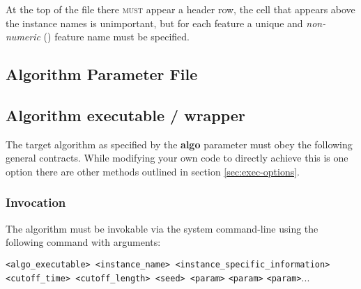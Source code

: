 \documentclass[manual.tex]{subfiles}
\begin{document}
At the top of the file there \textsc{must} appear a header row, the cell that appears above the instance names is unimportant, but for each feature a unique and \emph{non-numeric} () feature name must be specified.

\subsection{Algorithm Parameter File} \label{sec:paramfile}

 

\subsection{Algorithm executable / wrapper}

\label{sec:exec-spec} The target algorithm as specified by the \textbf{algo} parameter must obey the following general contracts. While modifying your own code to directly achieve this is one option there are other methods outlined in section \ref{sec:exec-options}.

\subsubsection{Invocation}

The algorithm must be invokable via the system command-line using the following command with arguments:

\texttt{<algo\_executable> <instance\_name> <instance\_specific\_information>
<cutoff\_time> <cutoff\_length> <seed> <param>} \texttt{<param>} \texttt{<param>}...
\end{document}
